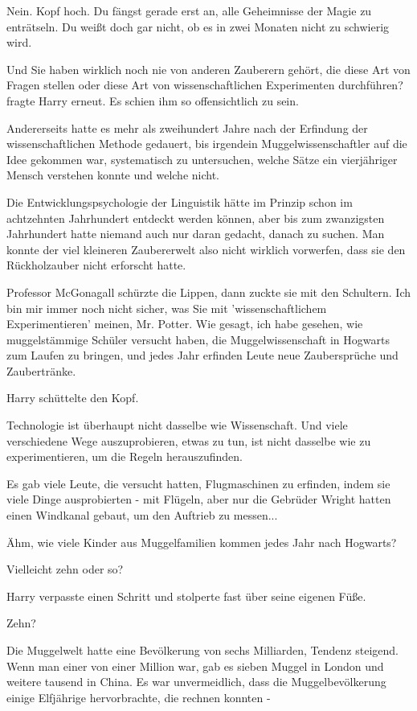 Nein. Kopf hoch. Du fängst gerade erst an, alle Geheimnisse der Magie zu
enträtseln. Du weißt doch gar nicht, ob es in zwei Monaten nicht zu schwierig
wird.

\glqq Und Sie haben wirklich noch nie von anderen Zauberern gehört, die diese
Art von Fragen stellen oder diese Art von wissenschaftlichen Experimenten
durchführen?\grqq{} fragte Harry erneut. Es schien ihm so offensichtlich zu
sein.

Andererseits hatte es mehr als zweihundert Jahre nach der Erfindung der
wissenschaftlichen Methode gedauert, bis irgendein Muggelwissenschaftler auf die
Idee gekommen war, systematisch zu untersuchen, welche Sätze ein vierjähriger
Mensch verstehen konnte und welche nicht.

Die Entwicklungspsychologie der Linguistik hätte im Prinzip schon im achtzehnten
Jahrhundert entdeckt werden können, aber bis zum zwanzigsten Jahrhundert hatte
niemand auch nur daran gedacht, danach zu suchen. Man konnte der viel kleineren
Zaubererwelt also nicht wirklich vorwerfen, dass sie den Rückholzauber nicht
erforscht hatte.

Professor McGonagall schürzte die Lippen, dann zuckte sie mit den Schultern.
\glqq Ich bin mir immer noch nicht sicher, was Sie mit 'wissenschaftlichem
Experimentieren' meinen, Mr. Potter. Wie gesagt, ich habe gesehen, wie
muggelstämmige Schüler versucht haben, die Muggelwissenschaft in Hogwarts zum
Laufen zu bringen, und jedes Jahr erfinden Leute neue Zaubersprüche und
Zaubertränke.\grqq{}

Harry schüttelte den Kopf.

\glqq Technologie ist überhaupt nicht dasselbe wie Wissenschaft. Und viele
verschiedene Wege auszuprobieren, etwas zu tun, ist nicht dasselbe wie zu
experimentieren, um die Regeln herauszufinden.\grqq{}

Es gab viele Leute, die versucht hatten, Flugmaschinen zu erfinden, indem sie
viele Dinge ausprobierten - mit Flügeln, aber nur die Gebrüder Wright hatten
einen Windkanal gebaut, um den Auftrieb zu messen...

\glqq Ähm, wie viele Kinder aus Muggelfamilien kommen jedes Jahr nach
Hogwarts?\grqq{}

\glqq Vielleicht zehn oder so?\grqq{}

Harry verpasste einen Schritt und stolperte fast über seine eigenen Füße.

\glqq Zehn?\grqq{}

Die Muggelwelt hatte eine Bevölkerung von sechs Milliarden, Tendenz steigend.
Wenn man einer von einer Million war, gab es sieben Muggel in London und weitere
tausend in China. Es war unvermeidlich, dass die Muggelbevölkerung einige
Elfjährige hervorbrachte, die rechnen konnten -

